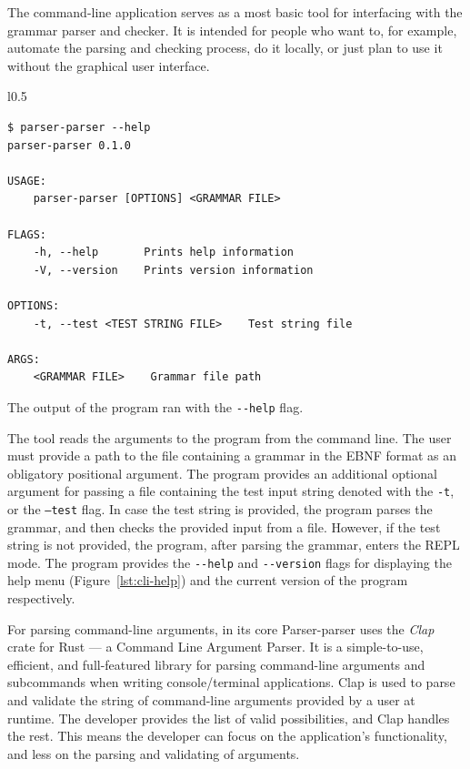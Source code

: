 \documentclass[english,bachelors,forcepolishlogotype]{wizthesis}
\newcommand{\thisproject}{Parser-parser}
\begin{document}
The command-line application serves as a most basic tool for interfacing with
the grammar parser and checker. It is intended for people who want to, for
example, automate the parsing and checking process, do it locally, or just plan
to use it without the graphical user interface.

\begin{wraplisting}{l}{0.5\textwidth}
  \begin{verbatim}
$ parser-parser --help
parser-parser 0.1.0

USAGE:
    parser-parser [OPTIONS] <GRAMMAR FILE>

FLAGS:
    -h, --help       Prints help information
    -V, --version    Prints version information

OPTIONS:
    -t, --test <TEST STRING FILE>    Test string file

ARGS:
    <GRAMMAR FILE>    Grammar file path
  \end{verbatim}
  \caption{The output of the program ran with the \texttt{-{}-help} flag.}
  \label{lst:cli-help}
\end{wraplisting}

The tool reads the arguments to the program from the command line. The user must
provide a path to the file containing a grammar in the EBNF format as an
obligatory positional argument. The program provides an additional optional
argument for passing a file containing the test input string denoted with the
\texttt{-t}, or the \texttt{--test} flag. In case the test string is provided,
the program parses the grammar, and then checks the provided input from a file.
However, if the test string is not provided, the program, after parsing the
grammar, enters the REPL mode. The program provides the \verb|--help| and
\verb|--version| flags for displaying the help menu
(Figure~\ref{lst:cli-help}) and the current version of the program respectively.

For parsing command-line arguments, in its core \thisproject{} uses the
\emph{Clap} crate for Rust --- a Command Line Argument Parser. It is a
simple-to-use, efficient, and full-featured library for parsing command-line
arguments and subcommands when writing console/terminal applications. Clap is
used to parse and validate the string of command-line arguments provided by a
user at runtime. The developer provides the list of valid possibilities, and
Clap handles the rest. This means the developer can focus on the application's
functionality, and less on the parsing and validating of arguments.
\end{document}
